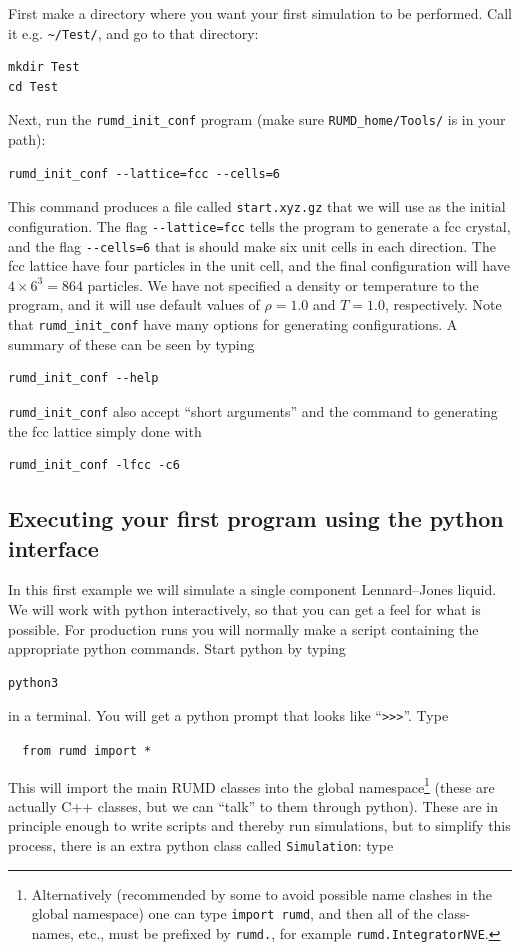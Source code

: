 First make a directory where you want your first simulation to be performed. Call
it e.g. \verb=~/Test/=, and go to that directory:
\begin{verbatim}
mkdir Test
cd Test
\end{verbatim}
Next, run the \verb=rumd_init_conf= program (make sure  \verb=RUMD_home/Tools/= is 
in your path):
\begin{verbatim}
rumd_init_conf --lattice=fcc --cells=6
\end{verbatim}
This command produces a file called \verb|start.xyz.gz| that we will use as the initial configuration. 
The flag \verb|--lattice=fcc| tells the program to generate a fcc crystal, and 
the flag \verb|--cells=6| that is should make six unit cells in each direction.
The fcc lattice have four particles in the unit cell, and the final configuration
will have $4\times6^3=864$ particles.
%
We have not specified a density or temperature to the program, 
and it will use default values of $\rho=1.0$ and $T=1.0$, respectively. 
Note that \verb|rumd_init_conf| have many options for generating configurations.
A summary of these can be seen by typing
\begin{verbatim} 
rumd_init_conf --help
\end{verbatim}
\verb|rumd_init_conf| also accept ``short arguments'' and the command to generating 
the fcc lattice simply done with
\begin{verbatim}
rumd_init_conf -lfcc -c6
\end{verbatim}

\newlength{\saveparindent}
\setlength{\saveparindent} {\parindent}
\setlength{\parindent}{0 pt}

\subsection{Executing your first program using the python interface}
%
In this first example we will simulate a single component
Lennard--Jones liquid. We will work with python interactively, so that you can
 get a feel for what is possible. For production runs you will normally
make a script containing the appropriate python commands. Start python by typing
\begin{verbatim}
python3
\end{verbatim}
in a terminal. You will get a python prompt that looks like 
``\verb|>>>|''. Type 

\verb|  from rumd import * |

This will import the main RUMD classes into the
global namespace\footnote{Alternatively (recommended by some to avoid possible name clashes in the global namespace) one can type \texttt{import rumd}, and then all of the class-names, etc., must be prefixed by \texttt{rumd.}, for example \texttt{rumd.IntegratorNVE}.} (these are actually C++ classes, but we can ``talk'' to them through python). These are in principle enough to write scripts and thereby run simulations, but to simplify this process, there is an extra python
class called \verb|Simulation|: type
 
